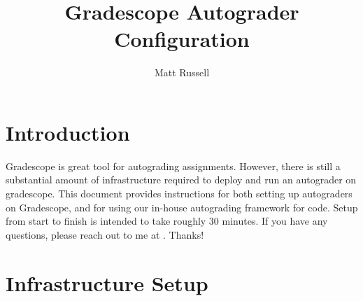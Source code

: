 \documentclass[11pt]{report}
\author{Matt Russell}
\title{Gradescope Autograder Configuration}
\begin{document}
\maketitle

\chapter*{Introduction}
Gradescope is great tool for autograding assignments. However, there is still a substantial amount
of infrastructure required to deploy and run an autograder on gradescope. This document provides 
instructions for both setting up autograders on Gradescope, and for using our in-house autograding
framework for  code. Setup from start to finish is intended to take roughly 30 minutes.
If you have any questions, please reach out to me at . Thanks!

\chapter*{Infrastructure Setup}
\end{document}
